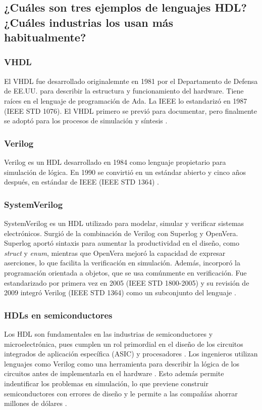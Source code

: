 \documentclass[12pt,letterpaper]{article}
\begin{document}

\subsection{¿Cuáles son tres ejemplos de lenguajes HDL? ¿Cuáles industrias los usan más habitualmente?}

\subsubsection{VHDL}
El VHDL fue desarrollado originalemnte en 1981 por el Departamento de Defensa de EE.UU. para describir la estructura y funcionamiento del hardware. Tiene raíces en el lenguaje de programación de Ada. La IEEE lo estandarizó en 1987 (IEEE STD 1076). El VHDL primero se previó para documentar, pero finalmente se adoptó para los procesos de simulación y síntesis \cite{harris2007}.

\subsubsection{Verilog}
Verilog es un HDL desarrollado en 1984 como lenguaje propietario para simulación de lógica. En 1990 se convirtió en un estándar abierto y cinco años después, en estándar de IEEE (IEEE STD 1364) \cite{harris2007}.

\subsubsection{SystemVerilog}
SystemVerilog es un HDL utilizado para modelar, simular y verificar sistemas electrónicos. Surgió de la combinación de Verilog con Superlog y OpenVera. Superlog aportó sintaxis para aumentar la productividad en el diseño, como \textit{struct} y \textit{enum}, mientras que OpenVera mejoró la capacidad de expresar aserciones, lo que facilita la verificación en simulación. Además, incorporó la programación orientada a objetos, que se usa comúnmente en verificación. Fue estandarizado por primera vez en 2005 (IEEE STD 1800-2005) y su revisión de 2009 integró Verilog (IEEE STD 1364) como un subconjunto del lenguaje \cite{systemverilogdev}.

\subsubsection{HDLs en semiconductores}

Los HDL son fundamentales en las industrias de semiconductores y microelectrónica, pues cumplen un rol primordial en el diseño de los circuitos integrados de aplicación específica (ASIC) y procesadores \cite{smith1998hdl}. Los ingenieros utilizan lenguajes como Verilog como una herramienta para describir la lógica de los circuitos antes de implementarla en el hardware \cite{Ansari2026}. Esto además permite indentificar los problemas en simulación, lo que previene construir semiconductores con errores de diseño y le permite a las compañías ahorrar millones de dólares \cite{harris2022hardware}.
\end{document}
